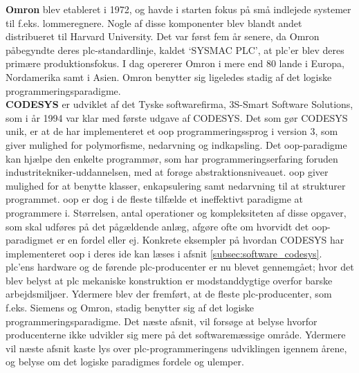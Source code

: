 \label{subsec:omron}
\noindent\textbf{Omron} blev etableret i 1972, og havde i starten fokus på små indlejede systemer til f.eks. lommeregnere. Nogle af disse komponenter blev blandt andet distribueret til Harvard University. Det var først fem år senere, da Omron påbegyndte deres \gls{plc}-standardlinje, kaldet \enquote*{SYSMAC PLC}, at \gls{plc}'er blev deres primære produktionsfokus. I dag opererer Omron i mere end 80 lande i Europa, Nordamerika samt i Asien\cite{plc-marked-shares}. Omron benytter sig ligeledes stadig af det logiske programmeringsparadigme.\\

\label{subsec:codesys}
\noindent\textbf{CODESYS} er udviklet af det Tyske softwarefirma, 3S-Smart Software Solutions, som i år 1994 var klar med første udgave af CODESYS. Det som gør CODESYS unik, er at de har implementeret et \gls{oop} programmeringssprog i version 3, som giver mulighed for polymorfisme, nedarvning og indkapsling. Det \gls{oop}-paradigme kan hjælpe den enkelte programmør, som har programmeringserfaring foruden industritekniker-uddannelsen, med at forøge abstraktionsniveauet. \gls{oop} giver mulighed for at benytte klasser, enkapsulering samt nedarvning til at strukturer programmet. \gls{oop} er dog i de fleste tilfælde et ineffektivt paradigme at programmere i. Størrelsen, antal operationer og kompleksiteten af disse opgaver, som skal udføres på det pågældende anlæg, afgøre ofte om hvorvidt det \gls{oop}-paradigmet er en fordel eller ej. Konkrete eksempler på hvordan CODESYS har implementeret \gls{oop} i deres \gls{ide} kan læses i afsnit \ref{subsec:software_codesys}. \\

\noindent \gls{plc}'ens hardware og de førende \gls{plc}-producenter er nu blevet gennemgået; hvor det blev belyst at \gls{plc} mekaniske konstruktion er modstanddygtige overfor barske arbejdsmiljøer. Ydermere blev der fremført, at de fleste \gls{plc}-producenter, som f.eks. Siemens og Omron, stadig benytter sig af det logiske programmeringsparadigme. Det næste afsnit, vil forsøge at belyse hvorfor producenterne ikke udvikler sig mere på det softwaremæssige område. Ydermere vil næste afsnit kaste lys over \gls{plc}-programmeringens udviklingen igennem årene, og belyse om det logiske paradigmes fordele og ulemper. 

